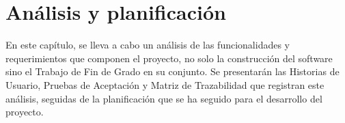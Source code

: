 \chapter{Análisis y planificación}

En este capítulo, se lleva a cabo un análisis de las funcionalidades y requerimientos que componen el proyecto, no solo la construcción del software sino el Trabajo de Fin de Grado en su conjunto. Se presentarán las Historias de Usuario, Pruebas de Aceptación y Matriz de Trazabilidad que registran este análisis, seguidas de la planificación que se ha seguido para el desarrollo del proyecto.


\newpage
